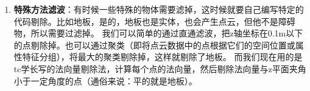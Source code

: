 \begin{enumerate}
\item \textbf{特殊方法滤波}：有时候一些特殊的物体需要滤掉，这时候就要自己编写特定的代码剔除。比如地板，是的，地板也是实体，也会产生点云，但他不是障碍物，所以需要过滤掉。
我们可以简单的通过直通滤波，把z轴坐标在0.1m以下的点剔除掉。也可以通过聚类（即将点云数据中的点根据它们的空间位置或属性特征分组），将最大的聚类剔除掉，这样就剔除了地板。
而我们现在用的是tc学长写的法向量剔除法，计算每个点的法向量，然后剔除法向量与z平面夹角小于一定角度的点（通俗来说：平的就是地板）。
\end{enumerate}

